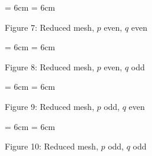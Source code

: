 \documentclass{slides}
\theoremstyle{definition}
\begin{document}



\begin{slide}
  \begin{center}
    \epsfxsize = 6cm
    \epsfysize = 6cm

Figure 7:  Reduced mesh, $p$ even, $q$ even
  \end{center}

\vspace{2cm}

  \begin{center}
    \epsfxsize = 6cm
    \epsfysize = 6cm

Figure 8:  Reduced mesh, $p$ even, $q$ odd
  \end{center}
\end{slide}

\begin{slide}
  \begin{center}
    \epsfxsize = 6cm
    \epsfysize = 6cm

Figure 9:  Reduced mesh, $p$ odd, $q$ even
  \end{center}

\vspace{2cm}

  \begin{center}
    \epsfxsize = 6cm
    \epsfysize = 6cm

Figure 10:  Reduced mesh, $p$ odd, $q$ odd
  \end{center}

\end{slide}
\end{document}
